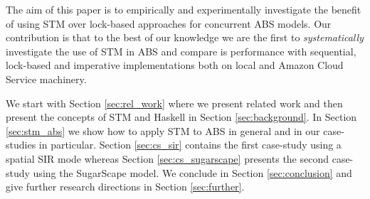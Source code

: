 The aim of this paper is to empirically and experimentally investigate the benefit of using STM over lock-based approaches for concurrent ABS models. Our contribution is that to the best of our knowledge we are the first to \textit{systematically} investigate the use of STM in ABS and compare is performance with sequential, lock-based and imperative implementations both on local and Amazon Cloud Service machinery.

We start with Section \ref{sec:rel_work} where we present related work and then present the concepts of STM and Haskell in Section \ref{sec:background}. In Section \ref{sec:stm_abs} we show how to apply STM to ABS in general and in our case-studies in particular. Section \ref{sec:cs_sir} contains the first case-study using a spatial SIR mode whereas Section \ref{sec:cs_sugarscape} presents the second case-study using the SugarScape model. We conclude in Section \ref{sec:conclusion} and give further research directions in Section \ref{sec:further}.